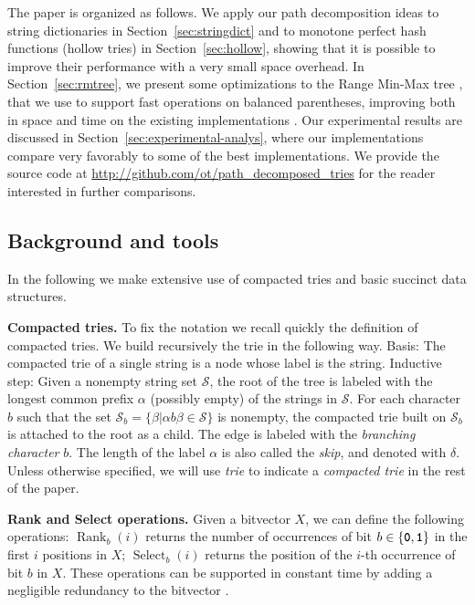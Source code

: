 \documentclass[a4paper,11pt]{article}
\newcommand{\ttlpar}[1]{\noindent\textbf{#1}}
\theoremstyle{nonumberplain}
\DeclareMathOperator{\Rank}{Rank}
\DeclareMathOperator{\Select}{Select}
\newcommand{\bit}[1]{\text{\bf\texttt{#1}}}
\newcommand{\bitzero}{\bit{0}}
\newcommand{\bitone}{\bit{1}}
\begin{document}
The paper is organized as follows. We apply our path decomposition ideas to string dictionaries in
Section~\ref{sec:stringdict} and to monotone perfect hash functions
(hollow tries) in Section~\ref{sec:hollow}, showing that it is
possible to improve their performance with a very small
space overhead. In Section~\ref{sec:rmtree}, we present some
optimizations to the Range Min-Max tree \cite{bpsoda10,bpalx10}, that we use
to support fast operations on balanced parentheses, improving
both in space and time on the existing
implementations \cite{bpalx10}. Our experimental results are discussed in
Section~\ref{sec:experimental-analys}, where our implementations compare very
favorably to some of the best implementations. We provide the source
code at \url{http://github.com/ot/path_decomposed_tries} for the
reader interested in further comparisons. 


\subsection{Background and tools}
\label{sub:background-tools}
In the following we make extensive use of compacted tries and basic
succinct data structures.


\ttlpar{Compacted tries.} 
To fix the notation we recall quickly the definition of compacted
tries. We build recursively the trie in the following way. Basis: The
compacted trie of a single string is a node whose label is the
string. Inductive step: Given a nonempty string set $\mathcal{S}$, the
root of the tree is labeled with the longest common prefix $\alpha$
(possibly empty) of the strings in $\mathcal{S}$. For each character
$b$ such that the set $\mathcal{S}_b = \{\beta | \alpha b\beta \in
\mathcal{S}\}$ is nonempty, the compacted trie built on
$\mathcal{S}_b$ is attached to the root as a child. The edge is
labeled with the \emph{branching character} $b$.  The length of the
label $\alpha$ is also called the \emph{skip}, and denoted with
$\delta$. Unless otherwise specified, we will use \emph{trie} to
indicate a \emph{compacted trie} in the rest of the paper.

\ttlpar{Rank and Select operations.}
Given a bitvector $X$, we can define the following operations: 
$\Rank_b(i)$ returns the number of occurrences of bit $b
\in \{ \bitzero, \bitone\}$ in the first $i$ positions in $X$;
$\Select_b(i)$ returns the position of the $i$-th occurrence of bit $b$
in $X$. These operations can be supported in constant time by adding a 
negligible redundancy to the bitvector \cite{Clark98,jacobson89}.
\end{document}
